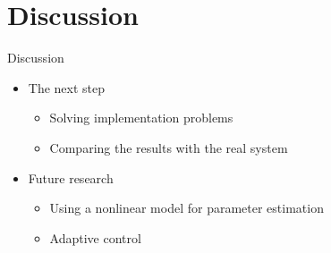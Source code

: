 \section{Discussion}
\begin{frame}{Discussion}{}

\begin{itemize}
	\item<1->The next step
	\begin{itemize}
	 \item<1-> Solving implementation problems  
	 \item<1-> Comparing the results with the real system
	\end{itemize}
\end{itemize}

\begin{itemize}
\item<2-> Future research
	 \begin{itemize}
	 \item<2-> Using a nonlinear model for parameter estimation 
	 \item<2-> Adaptive control
	 \end{itemize}
\end{itemize}

\end{frame}
